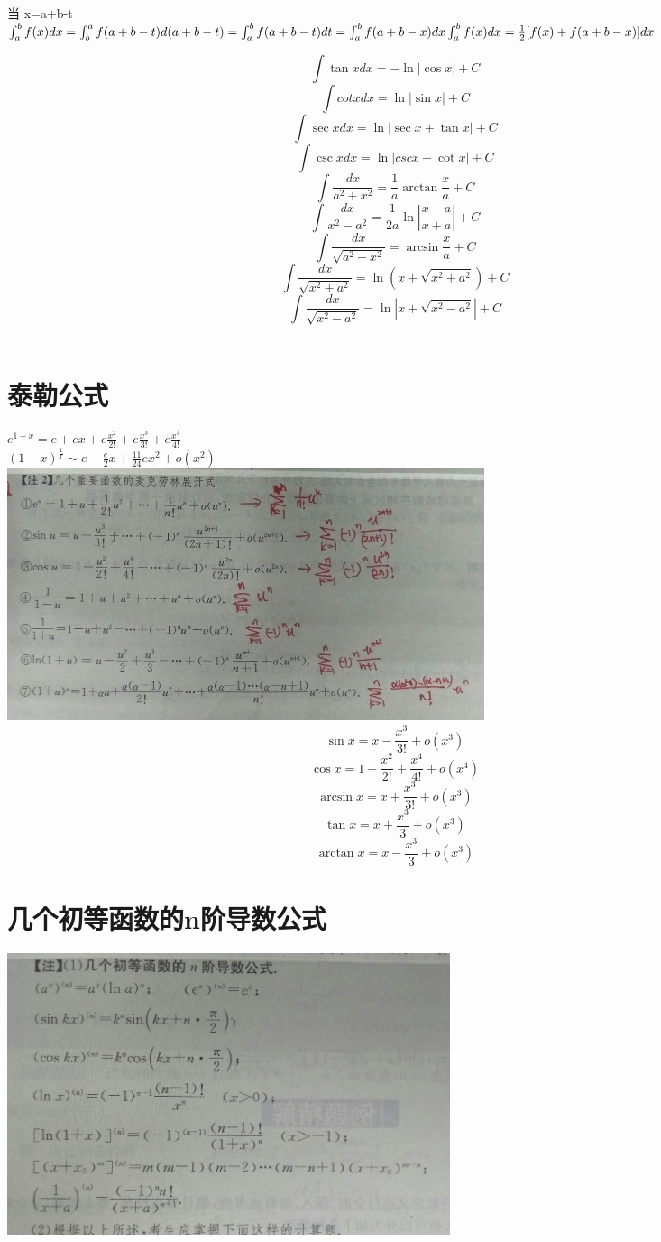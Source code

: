 \documentclass[UTF8]{ctexart}
\begin{document}
当 x=a+b-t \\
$ \int_a^b f(x) dx = \int_b^a f(a+b-t)d(a+b-t)=\int_a^bf(a+b-t)dt=\int_a^b f(a+b-x) dx \\
\int_a^b f(x) dx = \frac{1}{2} [ f(x) + f(a+b-x) ] dx$

$$ \int \tan x dx = - \ln |\cos x | +C$$
$$ \int cot x dx = \ln|\sin x| +C$$
$$ \int \sec x dx = \ln |\sec x+ \tan x| +C$$
$$ \int \csc x dx = \ln|csc x-\cot x | +C $$
$$ \int \frac{dx}{a^2+x^2}=\frac{1}{a} \arctan \frac{x}{a} +C $$
$$ \int \frac{dx}{x^2-a^2}=\frac{1}{2a} \ln \left| \frac{x-a}{x+a} \right| +C$$
$$ \int \frac{dx}{\sqrt{a^2-x^2}}=\arcsin \frac{x}{a}+C$$
$$ \int \frac {dx}{\sqrt{x^2+a^2}}=\ln {(x+ \sqrt{x^2+a^2})}+C$$
$$ \int \frac{dx}{\sqrt{x^2-a^2}}= \ln | x+\sqrt{x^2-a^2}|+C$$ \\

\section{泰勒公式}
$ e^{1+x}=e+ex+e \frac{x^2}{2!} + e \frac{x^3}{3!}+e\frac{x^4}{4!}$ \\
$ (1+x)^{\frac{1}{x}} \sim e-\frac{e}{2}x+\frac{11}{24}ex^2+o(x^2)$ \\
\includegraphics[width=14cm]{9345E7/F04F85A8EB6EABFF18D6BE71383F2472.jpg}
$$ \sin x=x-\frac{x^3}{3!}+o(x^3)$$
$$ \cos x=1-\frac{x^2}{2!}+\frac{x^4}{4!}+o(x^4)$$
$$ \arcsin x=x+\frac{x^3}{3!}+o(x^3)$$
$$ \tan x=x+\frac{x^3}{3}+o(x^3)$$
$$ \arctan x=x-\frac{x^3}{3}+o(x^3)$$

\section{几个初等函数的n阶导数公式}
\includegraphics[width=13cm]{9345E7/2A793F093B002F668B144F9ED087EB77.jpg}
\end{document}
